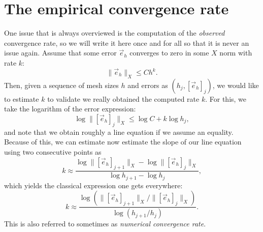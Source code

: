 \section{The empirical convergence rate}
One issue that is always overviewed is the computation of the \emph{observed} convergence rate, so we will write it here once and for all so that it is never an issue again. Assume that some error $\vec e_h$ converges to zero in some $X$ norm with rate $k$:
    \begin{equation*}
\|\vec e_h\|_X \leq C h^k.
\end{equation*}
    Then, given a sequence of mesh sizes $h$ and errors as $(h_j, [\vec e_h]_j)$, we would like to estimate $k$ to validate we really obtained the computed rate $k$. For this, we take the logarithm of the error expression:
    \begin{equation*}
\log \|[\vec e_h]_j\|_X \leq \log C + k \log h_j,
\end{equation*}
and note that we obtain roughly a line equation if we assume an equality. Because of this, we can estimate now estimate the slope of our line equation using two consecutive points as
\begin{equation*}
k \approx \frac{\log \|[\vec e_h]_{j+1}\|_X - \log \|[\vec e_h]_j\|_X}{ \log h_{j+1} - \log h_j},
\end{equation*}
which yields the classical expression one gets everywhere: 
    \begin{equation*}
k \approx  \frac{\log \left(\|[\vec e_h]_{j+1}\|_X / \|[\vec e_h]_j\|_X\right)}{ \log \left(h_{j+1} / h_j\right)}.
\end{equation*}
This is also referred to sometimes as \emph{numerical convergence rate}. 

